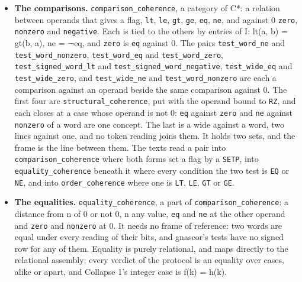 \begin{itemize}
\item \textbf{The comparisons.} \texttt{comparison\_\allowbreak{}coherence}, a category of C*: a relation between operands that gives a flag, \texttt{lt}, \texttt{le}, \texttt{gt}, \texttt{ge}, \texttt{eq}, \texttt{ne}, and against 0 \texttt{zero}, \texttt{nonzero} and \texttt{negative}. Each is tied to the others by entries of I: lt(a, b) = gt(b, a), ne = ¬eq, and \texttt{zero} is \texttt{eq} against 0. The pairs \texttt{test\_\allowbreak{}word\_\allowbreak{}ne} and \texttt{test\_\allowbreak{}word\_\allowbreak{}nonzero}, \texttt{test\_\allowbreak{}word\_\allowbreak{}eq} and \texttt{test\_\allowbreak{}word\_\allowbreak{}zero}, \texttt{test\_\allowbreak{}signed\_\allowbreak{}word\_\allowbreak{}lt} and \texttt{test\_\allowbreak{}signed\_\allowbreak{}word\_\allowbreak{}negative}, \texttt{test\_\allowbreak{}wide\_\allowbreak{}eq} and \texttt{test\_\allowbreak{}wide\_\allowbreak{}zero}, and \texttt{test\_\allowbreak{}wide\_\allowbreak{}ne} and \texttt{test\_\allowbreak{}word\_\allowbreak{}nonzero} are each a comparison against an operand beside the same comparison against 0. The first four are \texttt{structural\_\allowbreak{}coherence}, put with the operand bound to \texttt{RZ}, and each closes at a case whose operand is not 0: \texttt{eq} against \texttt{zero} and \texttt{ne} against \texttt{nonzero} of a word are one concept. The last is a wide against a word, two lines against one, and no token reading joins them. It holds two sets, and the frame is the line between them. The texts read a pair into \texttt{comparison\_\allowbreak{}coherence} where both forms set a flag by a \texttt{SETP}, into \texttt{equality\_\allowbreak{}coherence} beneath it where every condition the two test is \texttt{EQ} or \texttt{NE}, and into \texttt{order\_\allowbreak{}coherence} where one is \texttt{LT}, \texttt{LE}, \texttt{GT} or \texttt{GE}.
\item \textbf{The equalities.} \texttt{equality\_\allowbreak{}coherence}, a part of \texttt{comparison\_\allowbreak{}coherence}: a distance from n of 0 or not 0, n any value, \texttt{eq} and \texttt{ne} at the other operand and \texttt{zero} and \texttt{nonzero} at 0. It needs no frame of reference: two words are equal under every reading of their bits, and gnascor's tests have no signed row for any of them. Equality is purely relational, and maps directly to the relational assembly: every verdict of the protocol is an equality over cases, alike or apart, and Collapse 1's integer case is f(k) = h(k).

\end{itemize}
